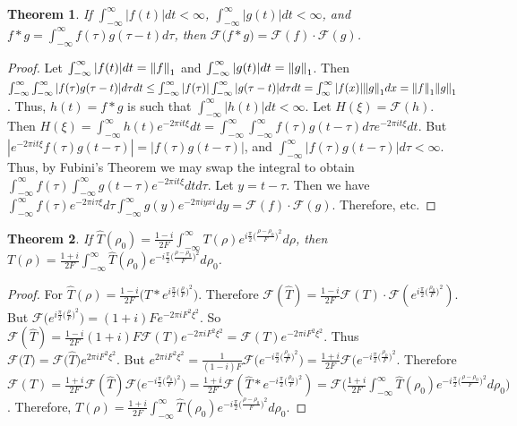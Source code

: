 \documentclass{article}
\theoremstyle{mystyle}
\newtheorem{theorem}{Theorem}[section]
\begin{document}
\begin{theorem}
If $\int_{-\infty}^{\infty} |f(t)|dt < \infty$, $\int_{-\infty}^{\infty} |g(t)|dt < \infty$, and $f* g = \int_{-\infty}^{\infty} f(\tau)g(\tau-t)d\tau$, then $\mathcal{F}\big(f * g\big) = \mathcal{F}(f)\cdot \mathcal{F}(g)$.
\end{theorem}
\begin{proof}
Let $\int_{-\infty}^{\infty} |f(t)|dt = \norm{f}_{1}$ and $\int_{-\infty}^{\infty} |g(t)|dt = \norm{g}_{1}$. Then $\int_{-\infty}^{\infty} \int_{-\infty}^{\infty} |f(\tau)g(\tau-t)|d\tau dt \leq \int_{-\infty}^{\infty} |f(\tau)| \int_{-\infty}^{\infty} |g(\tau-t)|d\tau dt = \int_{\infty}^{\infty}|f(x)|\norm{g}_{1}dx = \norm{f}_{1}\norm{g}_{1}$. Thus, $h(t) = f* g$ is such that $\int_{-\infty}^{\infty} |h(t)|dt < \infty$. Let $H(\xi) = \mathcal{F}(h)$. Then $H(\xi) = \int_{-\infty}^{\infty} h(t)e^{-2\pi i t \xi}dt = \int_{-\infty}^{\infty} \int_{-\infty}^{\infty} f(\tau)g(t-\tau)d\tau e^{-2\pi i t\xi}dt$. But $|e^{-2\pi i t \xi}f(\tau)g(t-\tau)| = |f(\tau)g(t-\tau)|$, and $\int_{-\infty}^{\infty}|f(\tau)g(t-\tau)|d\tau < \infty$. Thus, by Fubini's Theorem we may swap the integral to obtain $\int_{-\infty}^{\infty} f(\tau)\int_{-\infty}^{\infty}g(t-\tau)e^{-2\pi i t\xi}dtd\tau$. Let $y = t-\tau$. Then we have $\int_{-\infty}^{\infty} f(\tau)e^{-2\pi i \tau \xi}d\tau \int_{-\infty}^{\infty}g(y) e^{-2\pi i y xi}dy = \mathcal{F}(f) \cdot \mathcal{F}(g)$. Therefore, etc.
\end{proof}

\begin{theorem}
If $\hat{T}(\rho_0) = \frac{1-i}{2F}\int_{-\infty}^{\infty}T(\rho) e^{i\frac{\pi}{2}\big(\frac{\rho-\rho_0}{F}\big)^2}d\rho$, then $T(\rho) = \frac{1+i}{2F}\int_{-\infty}^{\infty}\hat{T}(\rho_0)e^{-i\frac{\pi}{2}\big(\frac{\rho-\rho_0}{F}\big)^2}d\rho_0$.
\end{theorem}
\begin{proof}
For $\hat{T}(\rho) = \frac{1-i}{2F}(T* e^{i \frac{\pi}{2}\big(\frac{\rho}{F}\big)^2}\big)$. Therefore $\mathcal{F}(\hat{T}) = \frac{1-i}{2F}\mathcal{F}(T)\cdot \mathcal{F}(e^{i\frac{\pi}{2}\big(\frac{\rho_0}{F}\big)^2})$. But $\mathcal{F}\big(e^{i\frac{\pi}{2}\big(\frac{\rho}{F}\big)^2}\big) = (1+i)Fe^{-2\pi i F^2 \xi^2}$. So $\mathcal{F}(\hat{T}) =\frac{1-i}{2F}(1+i)F \mathcal{F}(T) e^{-2\pi i F^2 \xi^2} = \mathcal{F}(T)e^{-2\pi i F^2 \xi^2}$. Thus $\mathcal{F
}\big(T\big) = \mathcal{F}\big(\hat{T}\big)e^{2\pi i F^2 \xi^2}$. But $e^{2\pi i F^2 \xi^2} = \frac{1}{(1-i)F}\mathcal{F}\big(e^{-i\frac{\pi}{2}\big(\frac{\rho_0}{F}\big)^2}\big) = \frac{1+i}{2F} \mathcal{F}\big(e^{-i\frac{\pi}{2}\big(\frac{\rho_0}{F}\big)^2}$. Therefore $\mathcal{F}(T) = \frac{1+i}{2F}\mathcal{F}(\hat{T})\mathcal{F}\big(e^{-i\frac{\pi}{2}\big(\frac{\rho_0}{F}\big)^2}\big) = \frac{1+i}{2F}\mathcal{F}(\hat{T}* e^{-i\frac{\pi}{2}\big(\frac{\rho_0}{F}\big)^2}) = \mathcal{F}\bigg(\frac{1+i}{2F}\int_{-\infty}^{\infty} \hat{T}(\rho_0)e^{-i\frac{\pi}{2}\big(\frac{\rho - \rho_0}{F}\big)^2} d\rho_0\bigg)$. Therefore, $T(\rho) = \frac{1+i}{2F}\int_{-\infty}^{\infty}\hat{T}(\rho_0)e^{-i\frac{\pi}{2}\big(\frac{\rho - \rho_0}{F}\big)^2}d\rho_0$.
\end{proof}
\end{document}
